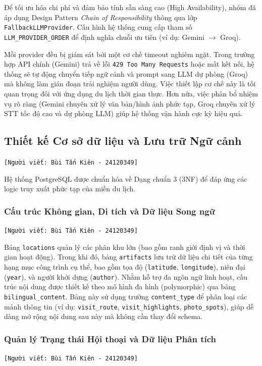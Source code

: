 Để tối ưu hóa chi phí và đảm bảo tính sẵn sàng cao (High Availability), nhóm đã áp dụng Design Pattern \textit{Chain of Responsibility} thông qua lớp \texttt{FallbackLLMProvider}. Cấu hình hệ thống cung cấp tham số \texttt{LLM\_PROVIDER\_ORDER} để định nghĩa chuỗi ưu tiên (ví dụ: Gemini $\rightarrow$ Groq).

Mỗi provider đều bị giám sát bởi một cơ chế timeout nghiêm ngặt. Trong trường hợp API chính (Gemini) trả về lỗi \texttt{429 Too Many Requests} hoặc mất kết nối, hệ thống sẽ tự động chuyển tiếp ngữ cảnh và prompt sang LLM dự phòng (Groq) mà không làm gián đoạn trải nghiệm người dùng. Việc thiết lập cơ chế này là tối quan trọng đối với ứng dụng du lịch thời gian thực. Hơn nữa, việc phân bổ nhiệm vụ rõ ràng (Gemini chuyên xử lý văn bản/hình ảnh phức tạp, Groq chuyên xử lý STT tốc độ cao và dự phòng LLM) giúp hệ thống vận hành cực kỳ hiệu quả.

\subsection{Thiết kế Cơ sở dữ liệu và Lưu trữ Ngữ cảnh}
\texttt{[Người viết: Bùi Tấn Kiên - 24120349]}

Hệ thống PostgreSQL được chuẩn hóa về Dạng chuẩn 3 (3NF) để đáp ứng các logic truy xuất phức tạp của miền du lịch.

\subsubsection{Cấu trúc Không gian, Di tích và Dữ liệu Song ngữ}
\texttt{[Người viết: Bùi Tấn Kiên - 24120349]}

Bảng \texttt{locations} quản lý các phân khu lớn (bao gồm ranh giới định vị và thời gian hoạt động). Trong khi đó, bảng \texttt{artifacts} lưu trữ dữ liệu chi tiết của từng hạng mục công trình cụ thể, bao gồm tọa độ (\texttt{latitude}, \texttt{longitude}), niên đại (\texttt{year}), và người khởi dựng (\texttt{author}). Nhằm hỗ trợ đa ngôn ngữ linh hoạt, cấu trúc nội dung được thiết kế theo mô hình đa hình (polymorphic) qua bảng \texttt{bilingual\_content}. Bảng này sử dụng trường \texttt{content\_type} để phân loại các mảnh thông tin (ví dụ: \texttt{visit\_route}, \texttt{visit\_highlights}, \texttt{photo\_spots}), giúp dễ dàng mở rộng nội dung sau này mà không cần thay đổi schema.

\subsubsection{Quản lý Trạng thái Hội thoại và Dữ liệu Phân tích}
\texttt{[Người viết: Bùi Tấn Kiên - 24120349]}

